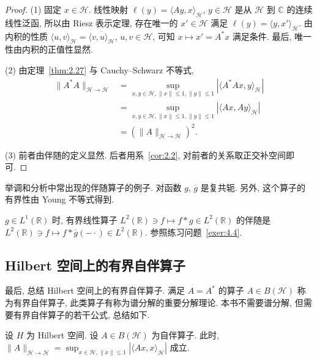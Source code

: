 \begin{proof}
(1) 固定 $x \in \mathcal{H}$. 线性映射 $\ell(y) = \langle Ay, x \rangle_{\mathcal{H}}$, $y \in \mathcal{H}$ 是从 $\mathcal{H}$ 到 $\mathbb{C}$ 的连续线性泛函, 所以由 Riesz 表示定理, 存在唯一的 $x' \in \mathcal{H}$ 满足 $\ell(y) = \langle y, x' \rangle_{\mathcal{H}}$. 由内积的性质 $\langle u, v \rangle_{\mathcal{H}} = \overline{\langle v, u \rangle_{\mathcal{H}}}$, $u, v \in \mathcal{H}$, 可知 $x \mapsto x' = A^{*}x$ 满足条件. 最后, 唯一性由内积的正值性显然.

(2) 由定理~\ref{thm:2.27} 与 Cauchy--Schwarz 不等式,
\begin{align*}
\|A^{*}A\|_{\mathcal{H} \to \mathcal{H}} &= \sup_{x, y \in \mathcal{H}, \|x\| \leq 1, \|y\| \leq 1}|\langle A^{*}Ax, y \rangle_{\mathcal{H}}| \\
&= \sup_{x, y \in \mathcal{H}, \|x\| \leq 1, \|y\| \leq 1}|\langle Ax, Ay \rangle_{\mathcal{H}}| \\
&= (\|A\|_{\mathcal{H} \to \mathcal{H}})^{2}.
\end{align*}

(3) 前者由伴随的定义显然. 后者用系~\ref{cor:2.2}, 对前者的关系取正交补空间即可.
\end{proof}

举调和分析中常出现的伴随算子的例子. 对函数 $g$, $\overline{g}$ 是复共轭. 另外, 这个算子的有界性由 Young 不等式得到.

\begin{example}\label{exa:2.6}
$g \in L^{1}(\mathbb{R})$ 时, 有界线性算子 $L^{2}(\mathbb{R}) \ni f \mapsto f * g \in L^{2}(\mathbb{R})$ 的伴随是 $L^{2}(\mathbb{R}) \ni f \mapsto f * \overline{g}(-\cdot) \in L^{2}(\mathbb{R})$. 参照练习问题~\ref{exer:4.4}.
\end{example}

\subsection*{Hilbert 空间上的有界自伴算子}

最后, 总结 Hilbert 空间上的有界自伴算子. 满足 $A = A^{*}$ 的算子 $A \in B(\mathcal{H})$ 称为有界自伴算子, 此类算子有称为谱分解的重要分解理论. 本书不需要谱分解, 但需要有界自伴算子的若干公式, 总结如下.

\begin{theorem}\label{thm:2.32}
设 $H$ 为 Hilbert 空间. 设 $A \in B(\mathcal{H})$ 为自伴算子. 此时, $\|A\|_{\mathcal{H} \to \mathcal{H}} = \sup_{x \in \mathcal{H}, \|x\| \leq 1}|\langle Ax, x \rangle_{\mathcal{H}}|$ 成立.
\end{theorem}

